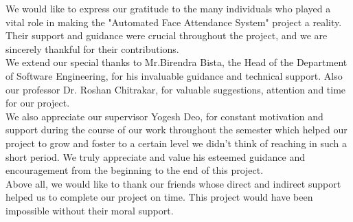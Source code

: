We would like to express our gratitude to the many individuals who played a vital role in making the 
"Automated Face Attendance System" project a reality. Their support and guidance were crucial throughout the project, and we are sincerely thankful for their contributions.\\

We extend our special thanks to Mr.Birendra Bista, the Head of the Department of Software Engineering, for his invaluable guidance and technical support. Also our professor Dr. Roshan Chitrakar, for valuable suggestions, attention and time for our project. \\

 We also appreciate our supervisor Yogesh Deo, for constant motivation and support during the course of our work throughout the semester which helped our project to grow and foster to a certain level we didn’t think of reaching in such a short period.  We truly appreciate and value his esteemed guidance and encouragement from the beginning to the end of this project.\\ 

Above all, we would like to thank our friends whose direct and indirect support helped us to complete our project on time. This project would have been impossible without their moral support.
\\
